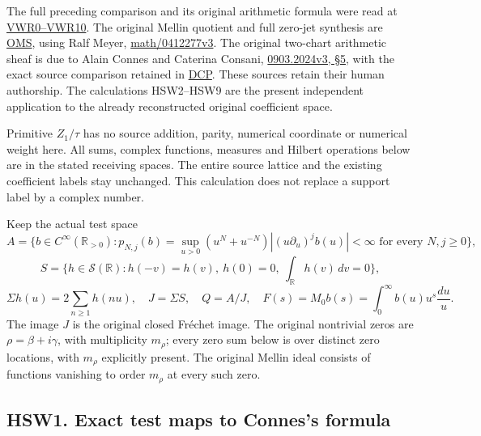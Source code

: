 The full preceding comparison and its original arithmetic formula were
read at
\href{https://github.com/KokunoYumeto/zeta-function-research-reader/blob/main/workbenches/splitzero-tandem/continuations/20260925-full-source-tensor-and-original-divisor/counterfactual/FULL_VERTICAL_WEIGHT_RETURN.md}{VWR0--VWR10}.
The original Mellin quotient and full zero-jet synthesis are
\href{https://github.com/KokunoYumeto/zeta-function-research-reader/blob/36a82ecca98addb8a98b48204e349737856c7223/workbenches/splitzero-tandem/continuations/20260924-cohomology-weight-and-character-lifts/original-character-lifting/tau_lifting_weights_20260924/ORIGINAL_MELLIN_SPECTRAL_SYNTHESIS.md}{OMS},
using Ralf Meyer,
\href{https://arxiv.org/abs/math/0412277v3}{math/0412277v3}. The
original two-chart arithmetic sheaf is due to Alain Connes and Caterina
Consani, \href{https://arxiv.org/abs/0903.2024v3}{0903.2024v3, §5}, with
the exact source comparison retained in
\href{https://github.com/KokunoYumeto/zeta-function-research-reader/blob/36a82ecca98addb8a98b48204e349737856c7223/workbenches/splitzero-tandem/continuations/20260924-cohomology-weight-and-character-lifts/original-character-lifting/tau_lifting_weights_20260924/SOURCE_CC_DOUBLE_PULLBACK.md}{DCP}.
These sources retain their human authorship. The calculations HSW2--HSW9
are the present independent application to the already reconstructed
original coefficient space.

Primitive \(Z_1/\tau\) has no source addition, parity, numerical
coordinate or numerical weight here. All sums, complex functions,
measures and Hilbert operations below are in the stated receiving
spaces. The entire source lattice and the existing coefficient labels
stay unchanged. This calculation does not replace a support label by a
complex number.

Keep the actual test space \[
A=\{b\in C^\infty(\mathbb R_{>0}):
p_{N,j}(b)=\sup_{u>0}(u^N+u^{-N})|(u\partial_u)^jb(u)|<\infty
\text{ for every }N,j\ge0\},
\] \[
S=\{h\in\mathcal S(\mathbb R):h(-v)=h(v),\ h(0)=0,\ \int_{\mathbb R}h(v)\,dv=0\},
\] \[
\Sigma h(u)=2\sum_{n\ge1}h(nu),\quad J=\Sigma S,\quad Q=A/J,\quad
F(s)=M_0b(s)=\int_0^\infty b(u)u^s\frac{du}{u}.
\tag{HSW0.1}
\] The image \(J\) is the original closed Fréchet image. The original
nontrivial zeros are \(\rho=\beta+i\gamma\), with multiplicity
\(m_\rho\); every zero sum below is over distinct zero locations, with
\(m_\rho\) explicitly present. The original Mellin ideal consists of
functions vanishing to order \(m_\rho\) at every such zero.

\subsection{HSW1. Exact test maps to Connes's
formula}\label{hsw1.-exact-test-maps-to-conness-formula}

